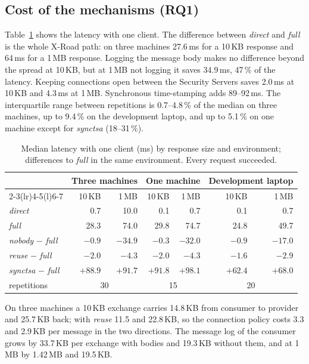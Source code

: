 \documentclass[conference,a4paper]{IEEEtran}
\begin{document}
\subsection{Cost of the mechanisms (RQ1)}

Table~\ref{tab:onecl} shows the latency with one client. The difference between \emph{direct} and
\emph{full} is the whole X-Road path: on three machines 27.6\,ms for a 10\,KB response and 64\,ms for
a 1\,MB response. Logging the message body makes no difference beyond the spread at 10\,KB, but at
1\,MB not logging it saves 34.9\,ms, 47\,\% of the latency. Keeping connections open between the
Security Servers saves 2.0\,ms at 10\,KB and 4.3\,ms at 1\,MB. Synchronous time-stamping adds
89--92\,ms. The interquartile range between repetitions is 0.7--4.8\,\% of the median on three machines, up
to 9.4\,\% on the development laptop, and up to 5.1\,\% on one machine except for \emph{synctsa}
(18--31\,\%).

\begin{table}[t]
\centering\small
\caption{Median latency with one client (ms) by response size and environment; differences to
\emph{full} in the same environment. Every request succeeded.}
\label{tab:onecl}
\begin{tabular}{@{}lrrrrrr@{}}
\toprule
& \multicolumn{2}{c}{Three machines} & \multicolumn{2}{c}{One machine} & \multicolumn{2}{c}{Development laptop} \\
\cmidrule(lr){2-3}\cmidrule(lr){4-5}\cmidrule(l){6-7}
& 10\,KB & 1\,MB & 10\,KB & 1\,MB & 10\,KB & 1\,MB \\
\midrule
\emph{direct} & 0.7 & 10.0 & 0.1 & 0.7 & 0.1 & 0.7 \\
\emph{full} & 28.3 & 74.0 & 29.8 & 74.7 & 24.8 & 49.7 \\
\emph{nobody} $-$ \emph{full} & $-0.9$ & $-34.9$ & $-0.3$ & $-32.0$ & $-0.9$ & $-17.0$ \\
\emph{reuse} $-$ \emph{full} & $-2.0$ & $-4.3$ & $-2.0$ & $-4.3$ & $-1.6$ & $-2.9$ \\
\emph{synctsa} $-$ \emph{full} & $+88.9$ & $+91.7$ & $+91.8$ & $+98.1$ & $+62.4$ & $+68.0$ \\
\midrule
repetitions & \multicolumn{2}{c}{30} & \multicolumn{2}{c}{15} & \multicolumn{2}{c}{20} \\
\bottomrule
\end{tabular}
\end{table}

On three machines a 10\,KB exchange carries 14.8\,KB from consumer to provider and 25.7\,KB back;
with \emph{reuse} 11.5 and 22.8\,KB, so the connection policy costs 3.3 and 2.9\,KB per message in the
two directions. The message log of the consumer grows by 33.7\,KB per exchange with bodies and
19.3\,KB without them, and at 1\,MB by 1.42\,MB and 19.5\,KB.
\end{document}
